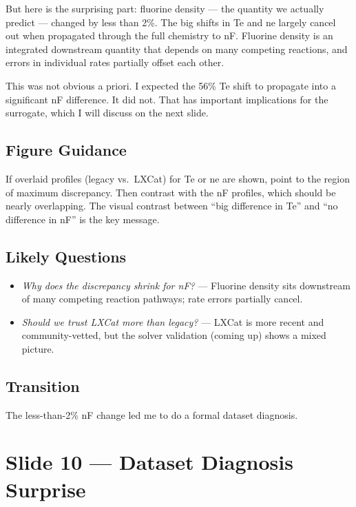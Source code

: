 \documentclass[12pt,a4paper]{article}
\begin{document}
But here is the surprising part: fluorine density --- the quantity we
actually predict --- changed by less than 2\%. The big shifts in Te
and ne largely cancel out when propagated through the full chemistry
to nF. Fluorine density is an integrated downstream quantity that
depends on many competing reactions, and errors in individual rates
partially offset each other.

This was not obvious a priori. I expected the 56\% Te shift to
propagate into a significant nF difference. It did not. That has
important implications for the surrogate, which I will discuss on the
next slide.

\subsection*{Figure Guidance}
If overlaid profiles (legacy vs.\ LXCat) for Te or ne are shown,
point to the region of maximum discrepancy. Then contrast with the
nF profiles, which should be nearly overlapping. The visual contrast
between ``big difference in Te'' and ``no difference in nF'' is the
key message.

\subsection*{Likely Questions}
\begin{itemize}
  \item \emph{Why does the discrepancy shrink for nF?}
    --- Fluorine density sits downstream of many competing reaction
    pathways; rate errors partially cancel.
  \item \emph{Should we trust LXCat more than legacy?}
    --- LXCat is more recent and community-vetted, but the solver
    validation (coming up) shows a mixed picture.
\end{itemize}

\subsection*{Transition}
The less-than-2\% nF change led me to do a formal dataset diagnosis.

\clearpage

\section{Slide 10 --- Dataset Diagnosis Surprise}
\label{sec:slide10}
\end{document}
